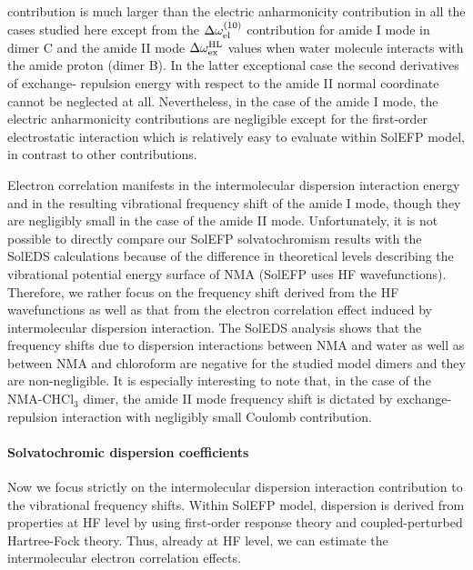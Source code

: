 \documentclass[a4paper,titlepage,twoside,fleqn,12pt]{book}
\begin{document}
\begin{refsection}
contribution is much larger than the electric
anharmonicity contribution in all the cases
studied here except from the $\Delta \omega_{{\rm el}}^{(10)}$ contribution for amide I mode 
in dimer C and the amide II mode
$\Delta \omega_{{\rm ex}}^{\rm HL}$ values when
water molecule interacts with the amide proton
(dimer B).
In the latter exceptional case the second derivatives of exchange\hyp{}
repulsion energy with respect to the amide II normal coordinate
cannot be neglected at all. 
Nevertheless, in the case of the amide I mode, the
electric anharmonicity contributions are negligible except for
the first\hyp{}order electrostatic interaction
which is relatively easy to evaluate within SolEFP model, in contrast to
other contributions.

Electron correlation manifests in the intermolecular
dispersion interaction energy and in the resulting vibrational
frequency shift of the amide I mode, though they are negligibly
small in the case of the amide II mode. Unfortunately, it is
not possible to directly compare our SolEFP solvatochromism
results with the SolEDS calculations because of the difference
in theoretical levels describing the vibrational potential energy
surface of NMA (SolEFP uses HF wavefunctions). Therefore,
we rather focus on the frequency shift derived from the HF
wavefunctions as well as that from the electron correlation
effect induced by intermolecular dispersion interaction. The
SolEDS analysis shows that the frequency shifts due to dispersion
interactions between NMA and water as well as between
NMA and chloroform are negative for the studied model
dimers and they are non\hyp{}negligible. It is especially interesting
to note that, in the case of the NMA\hyp{}CHCl$_3$ dimer, the amide
II mode frequency shift is dictated by exchange\hyp{}repulsion
interaction with negligibly small Coulomb contribution.

\paragraph{Solvatochromic dispersion coefficients\label{s:nma-sol-disp}}

Now we focus strictly on the intermolecular dispersion
interaction contribution to the vibrational frequency shifts.
Within SolEFP model, dispersion is derived from properties
at HF level by using first\hyp{}order response theory
and coupled\hyp{}perturbed Hartree\hyp{}Fock theory.
Thus, already at HF level, we can estimate the intermolecular
electron correlation effects.


\end{refsection}
\end{document}
